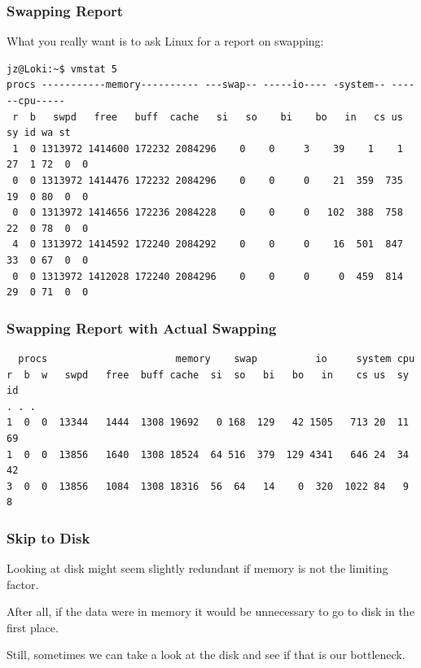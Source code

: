 \begin{frame}[fragile]
\frametitle{Swapping Report}

\Large
\begin{changemargin}{1cm}
What you really want is to ask Linux for a report on swapping:
\end{changemargin}
\vspace*{-2em}
{\scriptsize
\begin{verbatim}
jz@Loki:~$ vmstat 5
procs -----------memory---------- ---swap-- -----io---- -system-- ------cpu-----
 r  b   swpd   free   buff  cache   si   so    bi    bo   in   cs us sy id wa st
 1  0 1313972 1414600 172232 2084296    0    0     3    39    1    1 27  1 72  0  0
 0  0 1313972 1414476 172232 2084296    0    0     0    21  359  735 19  0 80  0  0
 0  0 1313972 1414656 172236 2084228    0    0     0   102  388  758 22  0 78  0  0
 4  0 1313972 1414592 172240 2084292    0    0     0    16  501  847 33  0 67  0  0
 0  0 1313972 1412028 172240 2084296    0    0     0     0  459  814 29  0 71  0  0
\end{verbatim}
}

\end{frame}



\begin{frame}[fragile]
\frametitle{Swapping Report with Actual Swapping}

{\small
\begin{verbatim}
  procs                      memory    swap          io     system cpu
r  b  w   swpd   free  buff cache  si  so   bi   bo   in    cs us  sy  id
. . .
1  0  0  13344   1444  1308 19692   0 168  129   42 1505   713 20  11  69
1  0  0  13856   1640  1308 18524  64 516  379  129 4341   646 24  34  42
3  0  0  13856   1084  1308 18316  56  64   14    0  320  1022 84   9   8
\end{verbatim}
}

\end{frame}



\begin{frame}
\frametitle{Skip to Disk}

\large
\begin{changemargin}{1cm}
Looking at disk might seem slightly redundant if memory is not the limiting factor. 

After all, if the data were in memory it would be unnecessary to go to disk in the first place. 

Still, sometimes we can take a look at the disk and see if that is our bottleneck.
\end{changemargin}

\end{frame}




